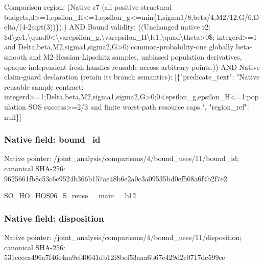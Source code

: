 \documentclass[10pt,a4paper]{article}
\begin{document}
\begingroup\raggedright\sloppy Comparison region:\allowbreak{} (Native r7 (all positive structural budgets,\allowbreak{}d>=\allowbreak{}1,\allowbreak{}epsilon\_\allowbreak{}H<=\allowbreak{}1,\allowbreak{}epsilon\_\allowbreak{}g<=\allowbreak{}min\{1,\allowbreak{}sigma1/\allowbreak{}8,\allowbreak{}beta/\allowbreak{}4,\allowbreak{}M2/\allowbreak{}12,\allowbreak{}G/\allowbreak{}6,\allowbreak{}Delta/\allowbreak{}(4-2sqrt(3))\}).) AND Bound validity:\allowbreak{} ((Unchanged native r2:\allowbreak{} \$d\textbackslash{}ge1,\allowbreak{}\textbackslash{}quad0<\textbackslash{}varepsilon\_\allowbreak{}g,\allowbreak{}\textbackslash{}varepsilon\_\allowbreak{}H\textbackslash{}le1,\allowbreak{}\textbackslash{}quad\textbackslash{}theta>0\$;\allowbreak{} integerd>=\allowbreak{}1 and Delta,\allowbreak{}beta,\allowbreak{}M2,\allowbreak{}sigma1,\allowbreak{}sigma2,\allowbreak{}G>0;\allowbreak{} common-probability-one globally beta-smooth and M2-Hessian-Lipschitz samples,\allowbreak{} unbiased population derivatives,\allowbreak{} opaque independent fresh handles reusable across arbitrary points.)) AND Native claim-guard declaration (retain its branch semantics):\allowbreak{} [\{"predicate\_\allowbreak{}text":\allowbreak{} "Native reusable sample contract:\allowbreak{} integerd>=\allowbreak{}1;\allowbreak{}Delta,\allowbreak{}beta,\allowbreak{}M2,\allowbreak{}sigma1,\allowbreak{}sigma2,\allowbreak{}G>0;\allowbreak{}0<epsilon\_\allowbreak{}g,\allowbreak{}epsilon\_\allowbreak{}H<=\allowbreak{}1;\allowbreak{}population SOS success>=\allowbreak{}2/\allowbreak{}3 and finite worst-path resource caps.",\allowbreak{} "region\_\allowbreak{}ref":\allowbreak{} null\}]\par\endgroup

\subsubsection{Native field: bound\_\allowbreak{}id}
Native pointer: /joint\_\allowbreak{}analysis/comparisons/4/bound\_\allowbreak{}uses/11/bound\_\allowbreak{}id; canonical SHA-256: 9625661fb8c53c6c9524b366b157ae48b6e2a0c3a09535bd0ef568a6f4b2f7e2

\begingroup\raggedright\sloppy SO\_\allowbreak{}HO\_\allowbreak{}HOS06\_\allowbreak{}S\_\allowbreak{}reuse\_\allowbreak{}\_\allowbreak{}main\_\allowbreak{}\_\allowbreak{}b12\par\endgroup

\subsubsection{Native field: disposition}
Native pointer: /joint\_\allowbreak{}analysis/comparisons/4/bound\_\allowbreak{}uses/11/disposition; canonical SHA-256: 531cecca496a7f46e4aa9ef40641db12f8bef53aaa6b67c429d2c0717dc599ce
\end{document}
